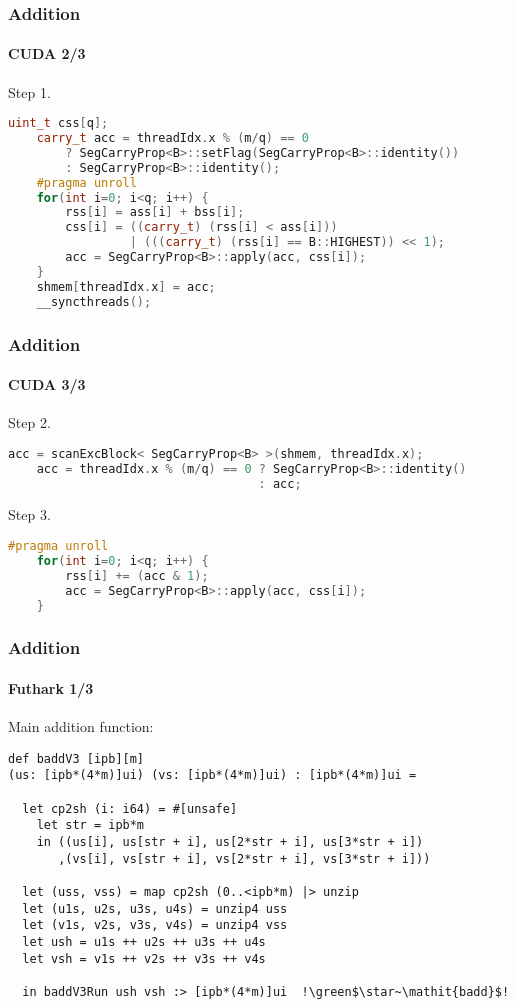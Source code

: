 \begin{frame}[fragile]
  \frametitle{Addition}
  \framesubtitle{CUDA 2/3}
  Step 1.
  \begin{lstlisting}[language=CPP,gobble=4,basicstyle=\scriptsize,firstnumber=18,frame=single]
    uint_t css[q];
    carry_t acc = threadIdx.x % (m/q) == 0
        ? SegCarryProp<B>::setFlag(SegCarryProp<B>::identity())
        : SegCarryProp<B>::identity();
    #pragma unroll
    for(int i=0; i<q; i++) {
        rss[i] = ass[i] + bss[i];
        css[i] = ((carry_t) (rss[i] < ass[i]))
                 | (((carry_t) (rss[i] == B::HIGHEST)) << 1);
        acc = SegCarryProp<B>::apply(acc, css[i]);
    }
    shmem[threadIdx.x] = acc;
    __syncthreads();
\end{lstlisting}
\end{frame}

\begin{frame}[fragile]
  \frametitle{Addition}
  \framesubtitle{CUDA 3/3}
  Step 2.
  \begin{lstlisting}[language=CPP,gobble=4,basicstyle=\scriptsize,firstnumber=31,frame=single]
    acc = scanExcBlock< SegCarryProp<B> >(shmem, threadIdx.x);
    acc = threadIdx.x % (m/q) == 0 ? SegCarryProp<B>::identity()
                                   : acc;
\end{lstlisting}
  Step 3.
\begin{lstlisting}[language=CPP,gobble=4,basicstyle=\scriptsize,firstnumber=34,frame=single]
    #pragma unroll
    for(int i=0; i<q; i++) {
        rss[i] += (acc & 1);
        acc = SegCarryProp<B>::apply(acc, css[i]);
    }
\end{lstlisting}
\end{frame}

\begin{frame}[fragile]
  \frametitle{Addition}
  \framesubtitle{Futhark 1/3}
  Main addition function:
\begin{lstlisting}[language=futhark,gobble=0,basicstyle=\scriptsize,escapeinside=!!,frame=single]
def baddV3 [ipb][m]
(us: [ipb*(4*m)]ui) (vs: [ipb*(4*m)]ui) : [ipb*(4*m)]ui =

  let cp2sh (i: i64) = #[unsafe]
    let str = ipb*m
    in ((us[i], us[str + i], us[2*str + i], us[3*str + i])
       ,(vs[i], vs[str + i], vs[2*str + i], vs[3*str + i]))

  let (uss, vss) = map cp2sh (0..<ipb*m) |> unzip
  let (u1s, u2s, u3s, u4s) = unzip4 uss
  let (v1s, v2s, v3s, v4s) = unzip4 vss
  let ush = u1s ++ u2s ++ u3s ++ u4s
  let vsh = v1s ++ v2s ++ v3s ++ v4s

  in baddV3Run ush vsh :> [ipb*(4*m)]ui  !\green$\star~\mathit{badd}$!
\end{lstlisting}
\end{frame}

